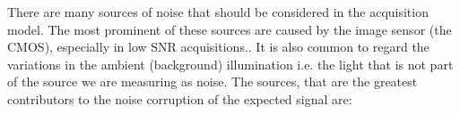 There are many sources of noise that should be considered in the acquisition model.
The most prominent of these sources are caused by the image sensor (the \ac{CMOS}), especially in low \ac{SNR}
    acquisitions.. %
It is also common to regard the variations in the ambient (background) illumination i.e. the light that is not part of 
    the source we are measuring as noise.
The sources, that are the greatest contributors to the noise corruption of the expected signal are:
\begin{marginfigure}
    \caption{The Poisson distribution and its continuous equivalent 
        \begin{equation*}
            \tilde{\distribution{P}}_{\lambda}(x) = \frac{e^{-\lambda}(\lambda)^x}{\Gamma(x + 1)},
        \end{equation*}
        for \(\lambda = 4\).
    }
\end{marginfigure}
\vspace{-0.8em}
